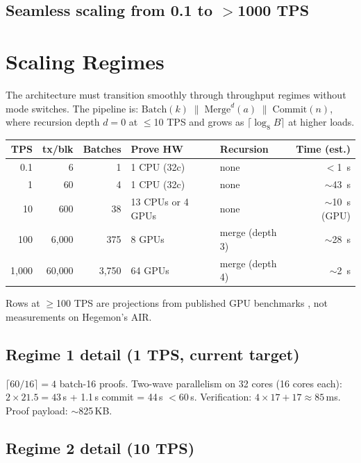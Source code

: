 \documentclass[11pt]{article}
\begin{document}
\subsection{Seamless scaling from 0.1 to $>$1000 TPS}

\section{Scaling Regimes}

The architecture must transition smoothly through throughput regimes without
mode switches. The pipeline is:
$\text{Batch}(k) \;\|\; \text{Merge}^{d}(a) \;\|\; \text{Commit}(n)$,
where recursion depth $d = 0$ at $\le$10 TPS and grows as $\lceil \log_8 B \rceil$
at higher loads.

\begin{center}
\begin{tabular}{@{}rrrllr@{}}
\toprule
\textbf{TPS} & \textbf{tx/blk} & \textbf{Batches} &
  \textbf{Prove HW} & \textbf{Recursion} & \textbf{Time (est.)} \\
\midrule
0.1 & 6 & 1 & 1 CPU (32c) & none & $<$1~s \\
1 & 60 & 4 & 1 CPU (32c) & none & $\sim$43~s \\
10 & 600 & 38 & 13 CPUs or 4 GPUs & none & $\sim$10~s (GPU) \\
100 & 6{,}000 & 375 & 8 GPUs & merge (depth 3) & $\sim$28~s \\
1{,}000 & 60{,}000 & 3{,}750 & 64 GPUs & merge (depth 4) & $\sim$2~s \\
\bottomrule
\end{tabular}
\end{center}

Rows at $\ge$100 TPS are projections from published GPU benchmarks
\cite{ingonyama2024,stwo2024}, not measurements on Hegemon's AIR.

\subsection{Regime 1 detail (1 TPS, current target)}

$\lceil 60/16 \rceil = 4$ batch-16 proofs. Two-wave parallelism on 32 cores
(16 cores each): $2 \times 21.5 = 43$\,s + 1.1\,s commit = 44\,s $ < 60$\,s.
Verification: $4 \times 17 + 17 \approx 85$\,ms. Proof payload: $\sim$825\,KB.

\subsection{Regime 2 detail (10 TPS)}
\end{document}
